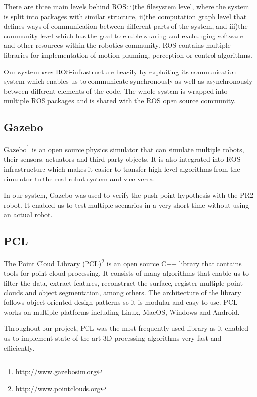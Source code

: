 There are three main levels behind ROS: i)the filesystem level, where the system is split into packages with similar structure, ii)the computation graph level that defines ways of communication between different parts of the system, and iii)the community level which has the goal to enable sharing and exchanging software and other resources within the robotics community. ROS contains multiple libraries for implementation of motion planning, perception or control algorithms.

Our system uses ROS-infrastructure heavily by exploiting its communication system which enables us to communicate synchronously as well as asynchronously between different elements of the code. The whole system is wrapped into multiple ROS packages and is shared with the ROS open source community.




\subsection{Gazebo}
Gazebo\footnote{\url{http://www.gazebosim.org}} is an open source physics simulator that can simulate multiple robots, their sensors, actuators and third party objects. It is also integrated into ROS infrastructure which makes it easier to transfer high level algorithms  from the simulator to the real robot system and vice versa.  

In our system, Gazebo was used to verify the push point hypothesis with the PR2 robot. It enabled us to test multiple scenarios in a very short time without using an actual robot.


\subsection{PCL}
The Point Cloud Library (PCL)\footnote{\url{http://www.pointclouds.org}} is an open source C++ library that contains tools for point cloud processing. It consists of many algorithms that enable us to filter the data, extract features, reconstruct the surface, register multiple point clouds and object segmentation, among others. The architecture of the library follows object-oriented design patterns so it is modular and easy to use. PCL works on multiple platforms including Linux, MacOS, Windows and Android. 

Throughout our project, PCL was the most frequently used library as it enabled us to implement state-of-the-art 3D processing algorithms very fast and efficiently.  

